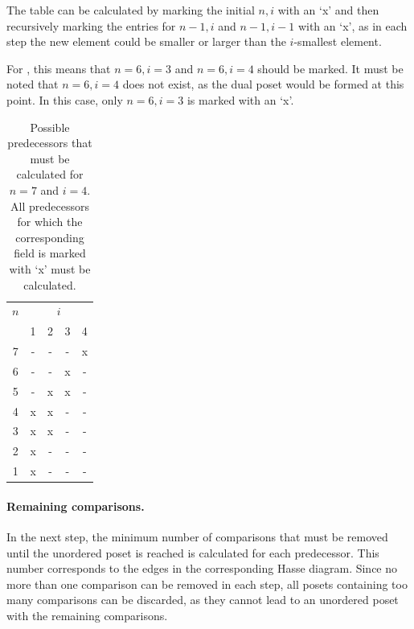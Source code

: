 \documentclass[twoside,leqno,twocolumn]{article}
\begin{document}
The table can be calculated by marking the initial $n, i$ with an `x' and then recursively marking the entries for $n - 1, i$ and $n - 1, i - 1$ with an `x', as in each step the new element could be smaller or larger than the $i$-smallest element.

For , this means that $n = 6, i = 3$ and $n = 6, i = 4$ should be marked.
It must be noted that $n = 6, i = 4$ does not exist, as the dual poset would be formed at this point.
In this case, only $n = 6, i = 3$ is marked with an `x'.

\begin{table}[!t]
  \renewcommand{\arraystretch}{1.1}
  \caption{Possible predecessors that must be calculated for $n = 7$ and $i = 4$.
    All predecessors for which the corresponding field is marked with `x' must be calculated.}
  \label{table:n_i_values_calculated}
  \centering
  \small
  \begin{tabular}{c|cccc}
    $n$ & \multicolumn{4}{c}{$i$}             \\
        & 1                       & 2 & 3 & 4 \\ \hline
    7   & -                       & - & - & x \\
    6   & -                       & - & x & - \\
    5   & -                       & x & x & - \\
    4   & x                       & x & - & - \\
    3   & x                       & x & - & - \\
    2   & x                       & - & - & - \\
    1   & x                       & - & - & - \\
  \end{tabular}%
\end{table}

\paragraph{Remaining comparisons.}
In the next step, the minimum number of comparisons that must be removed until the unordered poset is reached is calculated for each predecessor.
This number corresponds to the edges in the corresponding Hasse diagram.
Since no more than one comparison can be removed in each step, all posets containing too many comparisons can be discarded, as they cannot lead to an unordered poset with the remaining comparisons.
\end{document}
